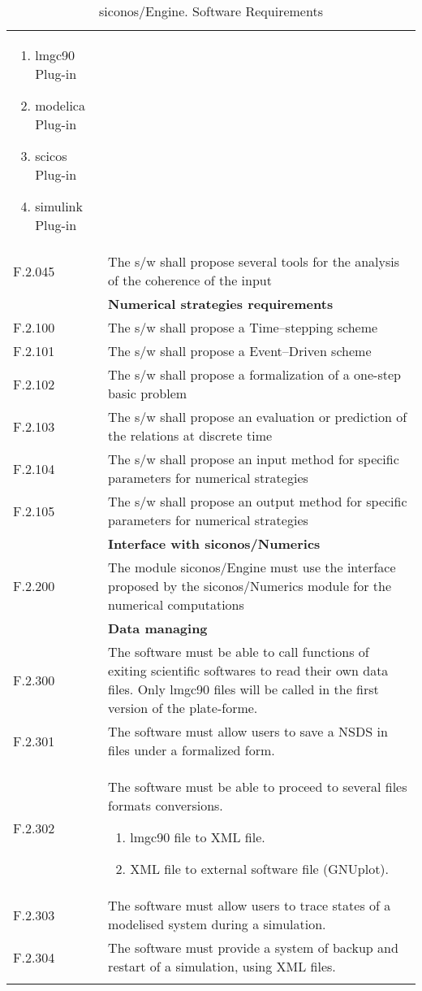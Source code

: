 \begin{longtable}{%
    |>{\columncolor[gray]{.8}}p{}%
    |>{\columncolor[gray]{.95}}p{}|}
  \begin{enumerate}
  \item \ac{lmgc90} Plug-in
  \item \ac{modelica} Plug-in
  \item \ac{scicos} Plug-in
  \item \ac{simulink} Plug-in
  \end{enumerate} \\
  F.2.045  &   The s/w shall propose several tools for the analysis of the coherence of the  input\\
 \hline
  & \textbf{Numerical strategies requirements }\\
  \hline
  F.2.100  & The s/w shall propose a Time--stepping scheme\\
  F.2.101  & The s/w shall propose a Event--Driven scheme\\
  F.2.102  & The s/w shall propose a formalization of a one-step basic problem\\
  F.2.103  & The s/w shall propose an evaluation or prediction of the relations at discrete time\\
  F.2.104  & The s/w shall propose an input method for specific parameters for numerical strategies\\
  F.2.105  & The s/w shall propose an output method for specific parameters for numerical strategies\\
  \hline
  & \textbf{Interface with \ac{siconos}/Numerics }\\
  \hline
  F.2.200  & The module \ac{siconos}/Engine must use the interface proposed by the  \ac{siconos}/Numerics module for the numerical computations \\
  \hline
  & \textbf{Data managing}\\
  \hline
  F.2.300  &  The software must be able to call functions of exiting scientific softwares to read their own data files. Only \ac{lmgc90} files will be called in the first version of the plate-forme. \\
  F.2.301  & The software must allow users to save a NSDS in files under a formalized form. \\
  F.2.302  & The software must be able to proceed to several files formats conversions.
                \begin{enumerate}
                \item \ac{lmgc90} file to XML file.
                \item XML file to external software file (GNUplot).
                \end{enumerate}\\ 
  F.2.303  & The software must allow users to trace states of a modelised system during a simulation. \\
  F.2.304  & The software must provide a system of backup and restart of a simulation, using XML files. \\
  \caption{\ac{siconos}/Engine. Software Requirements}\\
\end{longtable}



